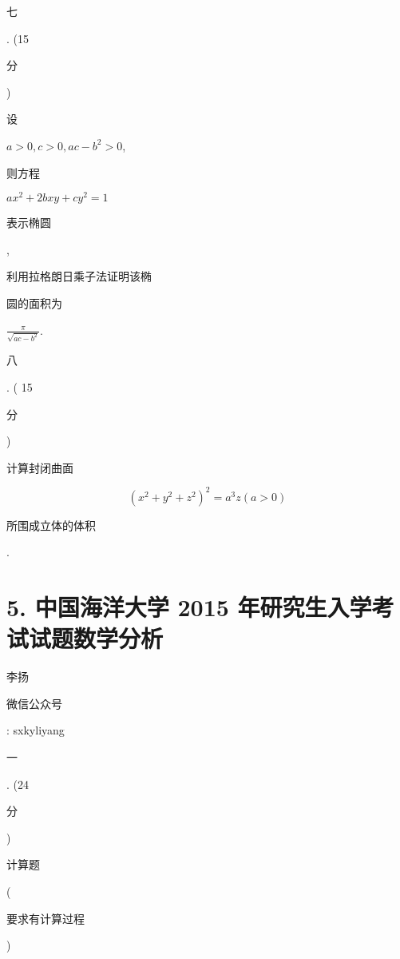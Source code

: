 \documentclass[10pt]{article}
\begin{document}
\begin{CJK}{UTF8}{mj}七\end{CJK}. (15 \begin{CJK}{UTF8}{mj}分\end{CJK}) \begin{CJK}{UTF8}{mj}设\end{CJK} $a>0, c>0, a c-b^{2}>0$, \begin{CJK}{UTF8}{mj}则方程\end{CJK} $a x^{2}+2 b x y+c y^{2}=1$ \begin{CJK}{UTF8}{mj}表示椭圆\end{CJK}, \begin{CJK}{UTF8}{mj}利用拉格朗日乘子法证明该椭\end{CJK} \begin{CJK}{UTF8}{mj}圆的面积为\end{CJK} $\frac{\pi}{\sqrt{a c-b^{2}}}$.

\begin{CJK}{UTF8}{mj}八\end{CJK}. ( 15 \begin{CJK}{UTF8}{mj}分\end{CJK}) \begin{CJK}{UTF8}{mj}计算封闭曲面\end{CJK}
$$
\left(x^{2}+y^{2}+z^{2}\right)^{2}=a^{3} z(a>0)
$$
\begin{CJK}{UTF8}{mj}所围成立体的体积\end{CJK}.

\section{5. 中国海洋大学 2015 年研究生入学考试试题数学分析}
\begin{CJK}{UTF8}{mj}李扬\end{CJK}

\begin{CJK}{UTF8}{mj}微信公众号\end{CJK}: sxkyliyang

\begin{CJK}{UTF8}{mj}一\end{CJK}. (24 \begin{CJK}{UTF8}{mj}分\end{CJK}) \begin{CJK}{UTF8}{mj}计算题\end{CJK} (\begin{CJK}{UTF8}{mj}要求有计算过程\end{CJK})
\end{document}
